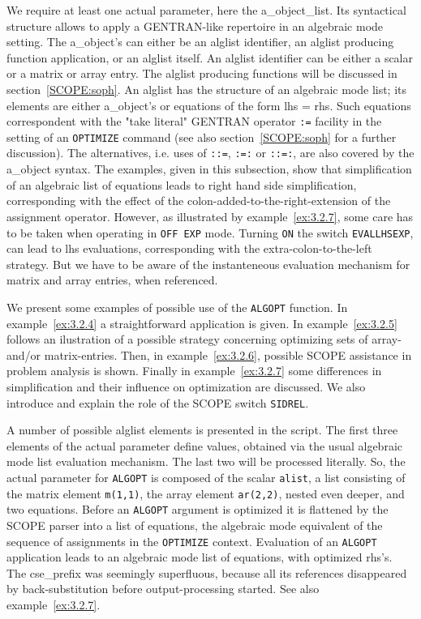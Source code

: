 We require at least one actual parameter, here the a\_object\_list. Its
syntactical structure allows to apply a GENTRAN-like repertoire in an
algebraic mode setting. The a\_object's can
either be an alglist identifier, an alglist producing function application,
or an alglist itself. An alglist identifier can be
either a scalar or a matrix or array entry. The alglist producing
functions will be discussed in section~\ref{SCOPE:soph}. An alglist has the
structure of an algebraic mode list; its elements are either a\_object's
or equations of the form lhs = rhs. Such equations correspondent
with the "take literal" GENTRAN operator {\tt :=} facility in the setting
of an {\tt OPTIMIZE} command (see also section~\ref{SCOPE:soph} for a further
discussion). The alternatives, i.e. uses of {\tt ::=}, {\tt :=:} or {\tt ::=:},
are also covered by the a\_object syntax.
The examples, given in this subsection, show that simplification of an algebraic
list of equations leads to right hand side simplification, corresponding with
the effect of the colon-added-to-the-right-extension of the assignment operator.
However, as illustrated by example~\ref{ex:3.2.7}, some care has to be taken
when operating in {\tt OFF EXP} mode.
Turning {\tt ON} the switch {\tt EVALLHSEXP}, can lead to lhs evaluations,
corresponding with the extra-colon-to-the-left strategy. But we have to
be aware of the instanteneous evaluation mechanism for matrix and
array entries, when referenced.

We present some examples of possible use of the {\tt ALGOPT} function.
In example~\ref{ex:3.2.4} a straightforward application is given.
In example~\ref{ex:3.2.5} follows an ilustration of a possible strategy
concerning optimizing sets of array- and/or matrix-entries. Then,
in example~\ref{ex:3.2.6}, possible SCOPE assistance in problem analysis is
shown. Finally in example~\ref{ex:3.2.7}
some differences in simplification and their influence on optimization are
discussed. We also introduce and explain the role of the SCOPE
switch {\tt SIDREL}.

\example\label{ex:3.2.4}

A number of possible alglist elements is presented in the script.
The first three elements of the actual parameter define values, obtained
via the usual algebraic mode list evaluation mechanism. The last two will be
processed literally. So, the actual parameter for {\tt ALGOPT} is composed
of the scalar {\tt alist}, a list consisting of the matrix element {\tt m(1,1)},
the array element {\tt ar(2,2)}, nested even deeper, and two equations. Before
an {\tt ALGOPT} argument is optimized it is flattened by the SCOPE parser
into a list of equations, the algebraic mode equivalent of the sequence of
assignments in the {\tt OPTIMIZE} context. Evaluation of an {\tt ALGOPT}
application leads to an algebraic mode list of equations, with optimized rhs's.
The cse\_prefix was seemingly superfluous, because all its references
disappeared by back-substitution before output-processing started. See also
example~\ref{ex:3.2.7}.

